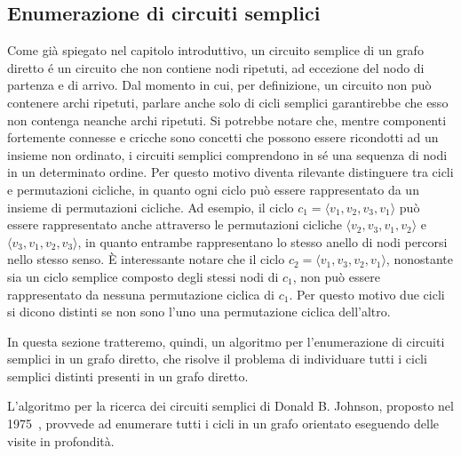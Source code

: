 \subsection{Enumerazione di circuiti semplici}\label{sec:enumerazione-di-cicli}

Come gi\`a spiegato nel capitolo introduttivo, un circuito semplice di un grafo diretto \'e un circuito
che non contiene nodi ripetuti, ad eccezione del nodo di partenza e di arrivo.
Dal momento in cui, per definizione, un circuito non pu\`o contenere archi ripetuti, parlare anche solo di cicli
semplici garantirebbe che esso non contenga neanche archi ripetuti.
Si potrebbe notare che, mentre componenti fortemente connesse e cricche sono concetti che possono essere
ricondotti ad un insieme non ordinato, i circuiti semplici comprendono in s\'e una sequenza di nodi in un determinato
ordine.
Per questo motivo diventa rilevante distinguere tra cicli e permutazioni cicliche, in quanto ogni ciclo
pu\`o essere rappresentato da un insieme di permutazioni cicliche.
Ad esempio, il ciclo $c_1 = \langle v_1, v_2, v_3, v_1 \rangle$ pu\`o essere rappresentato anche attraverso le
permutazioni cicliche $\langle v_2, v_3, v_1, v_2 \rangle$ e $\langle v_3, v_1, v_2, v_3 \rangle$, in quanto entrambe
rappresentano lo stesso anello di nodi percorsi nello stesso senso. \newline
\`E interessante notare che il ciclo $c_2 = \langle v_1, v_3, v_2, v_1 \rangle$, nonostante sia un ciclo semplice
composto degli stessi nodi di $c_1$, non pu\`o essere rappresentato da nessuna permutazione ciclica di $c_1$.
Per questo motivo due cicli si dicono distinti se non sono l'uno una permutazione ciclica dell'altro. \newline

In questa sezione tratteremo, quindi, un algoritmo per l'enumerazione di circuiti semplici in un grafo diretto, che
risolve il problema di individuare tutti i cicli semplici distinti presenti in un grafo diretto.


L'algoritmo per la ricerca dei circuiti semplici di Donald B. Johnson, proposto nel 1975~\cite{doi:10.1137/0204007},
provvede ad enumerare tutti i cicli in un grafo orientato eseguendo delle visite in profondit\`a. \newline

